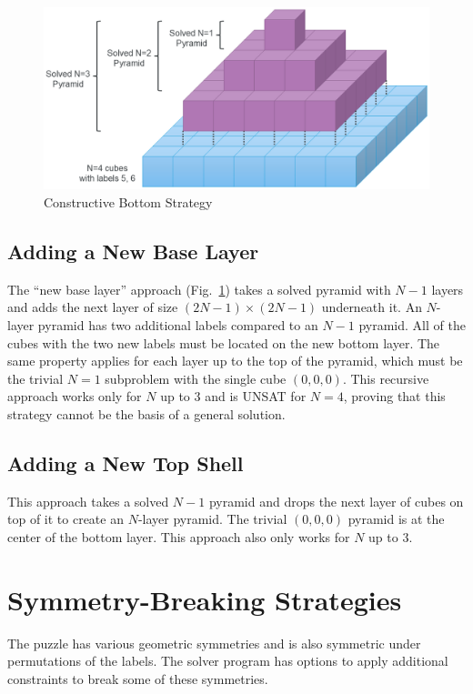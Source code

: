 \documentclass[conference]{IEEEtran}
\begin{document}
\begin{figure}[!t]
\centerline{\includegraphics[width=\linewidth]{constructive_bottom.png}}
\caption{Constructive Bottom Strategy}
\label{constructive_bottom}
\end{figure}

\subsection{Adding a New Base Layer}

The ``new base layer'' approach (Fig.~\ref{constructive_bottom}) takes a solved pyramid with $N-1$ layers and adds the next layer of size $(2N-1)\times(2N-1)$ underneath it.
An $N$\nobreakdash-layer pyramid has two additional labels compared to an $N-1$ pyramid.
All of the cubes with the two new labels must be located on the new bottom layer.
The same property applies for each layer up to the top of the pyramid, which must be the trivial $N=1$ subproblem with the single cube $(0,0,0)$.
This recursive approach works only for $N$ up to 3 and is UNSAT for $N=4$, proving that this strategy cannot be the basis of a general solution.

\subsection{Adding a New Top Shell}

This approach takes a solved $N-1$ pyramid and drops the next layer of cubes on top of it to create an $N$-layer pyramid.
The trivial $(0,0,0)$ pyramid is at the center of the bottom layer.
This approach also only works for $N$ up to 3.

\section{Symmetry-Breaking Strategies}

The puzzle has various geometric symmetries and is also symmetric under permutations of the labels.
The solver program has options to apply additional constraints to break some of these symmetries.
\end{document}
